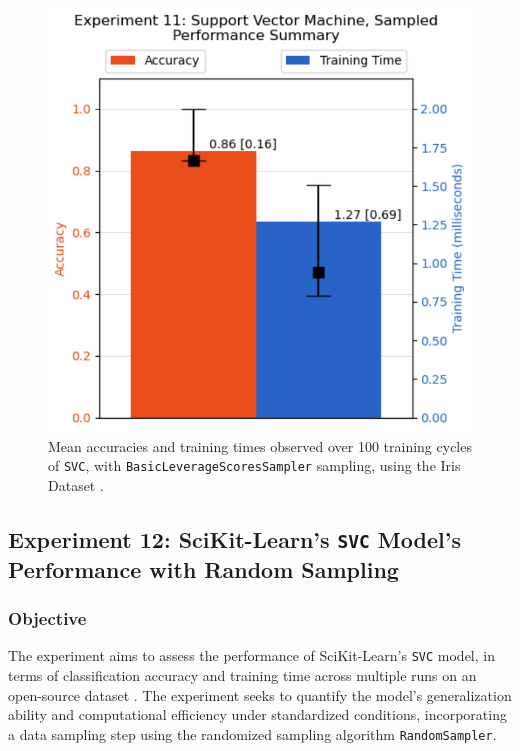\documentclass{article}
\theoremstyle{plain}
\theoremstyle{definition}
\theoremstyle{remark}
\begin{document}
\begin{figure}[ht]
	\vskip 0.2in
	\begin{center}
		\centerline{\includegraphics[width=\columnwidth]{experiment_11}}
		\caption{Mean accuracies and training times observed over 100 training cycles of \texttt{SVC}, with \texttt{BasicLeverageScoresSampler} sampling, using the Iris Dataset \cite{iris}.}
		\label{experiment_11}
	\end{center}
	\vskip -0.2in
\end{figure}


\subsection{Experiment 12: SciKit-Learn's \texttt{SVC} Model's Performance with Random Sampling}

\subsubsection{Objective}

The experiment aims to assess the performance of SciKit-Learn's \texttt{SVC} model, in terms of classification accuracy and training time across multiple runs on an open-source dataset \cite{iris}. The experiment seeks to quantify the model's generalization ability and computational efficiency under standardized conditions, incorporating a data sampling step using the randomized sampling algorithm \texttt{RandomSampler}.
\end{document}
